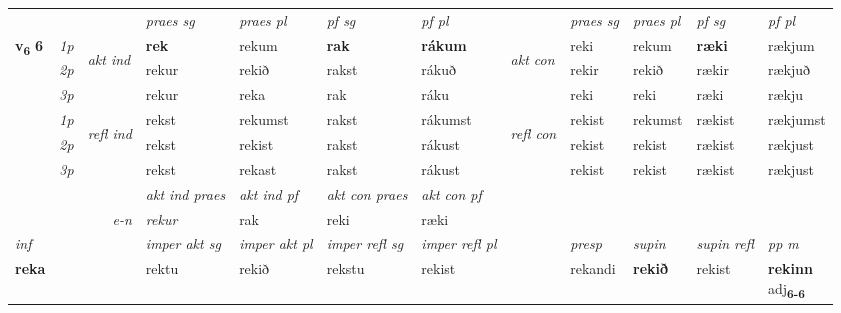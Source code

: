\begin{longtable}[l]{X>{\footnotesize\itshape}llXXXXlXXXX}
\midrule

 & &   & \textit{praes sg}  & \textit{praes pl}    & \textit{ pf sg} & \textit{pf pl} & & \textit{praes sg}  & \textit{praes pl}    & \textit{pf sg} & \textit{pf pl }  \\ \cmidrule{4-7} \cmidrule{9-12}
 \multirow{2}{*}{{{\textbf{v{\textsubscript{6}}} \Large{\textbf{6}}}}}  & 1p & \multirow{3}{*}{\begin{turn}{90}\textit{akt ind}\end{turn}} & \textbf{rek} & rekum & \textbf{rak} & \textbf{rákum} & \multirow{3}{*}{\begin{turn}{90}\textit{akt con}\end{turn}} &reki & rekum & \textbf{ræki} & rækjum\\*
 & 2p &  &  rekur  & rekið & rakst & rákuð & & rekir & rekið & rækir & rækjuð \\*
 & 3p &  & rekur & reka & rak & ráku & & reki & reki& ræki & rækju \\*
\cmidrule{4-7} \cmidrule{9-12}
 & 1p & \multirow{3}{*}{\begin{turn}{90}\textit{refl ind}\end{turn}}  & rekst & rekumst & rakst & rákumst & \multirow{3}{*}{\begin{turn}{90}\textit{refl con}\end{turn}}  &rekist & rekumst & rækist & rækjumst \\*
 & 2p &  & rekst & rekist & rakst & rákust & &rekist & rekist & rækist & rækjust \\*
 & 3p  & & rekst & rekast & rakst & rákust & & rekist & rekist& rækist & rækjust \\*
\cmidrule{4-7} \cmidrule{9-12}

   && &  \textit{akt ind praes} & \textit{akt ind pf} & \textit{akt con praes} & \textit{akt con pf} \\*
\multicolumn{3}{r}{\textit{e-n}} & rekur & rak & reki & ræki \\*

\cmidrule{4-7}
   {\textit{inf}} & &  & \textit{imper akt sg} & \textit{imper akt pl} & \textit{imper refl sg} & \textit{imper refl pl} && \textit{presp} & \textit{supin} & \textit{supin refl} & \textit{pp m} \\*
  {\textbf{reka}} & && rektu  & rekið & rekstu & rekist && rekandi &  \textbf{rekið} & rekist & \specialcell{\textbf{rekinn} \\ adj\textbf{\textsubscript{6-6}}} \\*


\end{longtable}
